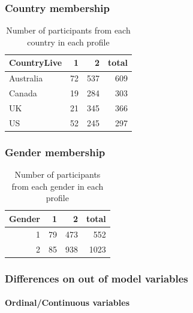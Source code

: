 \documentclass[]{article}
\let\oldparagraph\paragraph
\renewcommand{\paragraph}[1]{\oldparagraph{#1}\mbox{}}
\begin{document}
\hypertarget{country-membership}{%
\subsubsection{Country membership}\label{country-membership}}

\begin{table}[H]

\caption{\label{tab:unnamed-chunk-7}Number of participants from each country in each profile}
\centering
\fontsize{6}{8}\selectfont
\begin{tabular}[t]{lrrr}
\toprule
CountryLive & 1 & 2 & total\\
\midrule
Australia & 72 & 537 & 609\\
Canada & 19 & 284 & 303\\
UK & 21 & 345 & 366\\
US & 52 & 245 & 297\\
\bottomrule
\end{tabular}
\end{table}

\hypertarget{gender-membership}{%
\subsubsection{Gender membership}\label{gender-membership}}

\begin{table}[H]

\caption{\label{tab:unnamed-chunk-8}Number of participants from each gender in each profile}
\centering
\fontsize{6}{8}\selectfont
\begin{tabular}[t]{rrrr}
\toprule
Gender & 1 & 2 & total\\
\midrule
1 & 79 & 473 & 552\\
2 & 85 & 938 & 1023\\
\bottomrule
\end{tabular}
\end{table}

\newpage

\hypertarget{differences-on-out-of-model-variables}{%
\subsubsection{Differences on out of model
variables}\label{differences-on-out-of-model-variables}}

\hypertarget{ordinalcontinuous-variables}{%
\paragraph{Ordinal/Continuous
variables}\label{ordinalcontinuous-variables}}
\end{document}
